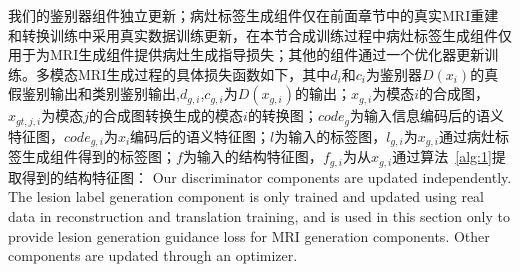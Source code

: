 \documentclass[letterpaper]{article} %
\begin{document}
我们的鉴别器组件独立更新；病灶标签生成组件仅在前面章节中的真实MRI重建和转换训练中采用真实数据训练更新，在本节合成训练过程中病灶标签生成组件仅用于为MRI生成组件提供病灶生成指导损失；其他的组件通过一个优化器更新训练。多模态MRI生成过程的具体损失函数如下，其中$d_{i}$和$c_{i}$为鉴别器$D(x_i)$的真假鉴别输出和类别鉴别输出,$d_{g,i}$,$c_{g,i}$为$D(x_{g,i})$的输出；$x_{g,i}$为模态$i$的合成图，$x_{gt,j,i}$为模态$j$的合成图转换生成的模态$i$的转换图；$code_g$为输入信息编码后的语义特征图，$code_{g,i}$为$x_i$编码后的语义特征图；$l$为输入的标签图，$l_{g,i}$为$x_{g,i}$通过病灶标签生成组件得到的标签图；$f$为输入的结构特征图，$f_{g,i}$为从$x_{g,i}$通过算法~\ref{alg:1}提取得到的结构特征图：
Our discriminator components are updated independently. The lesion label generation component is only trained and updated using real data in reconstruction and translation training, and is used in this section only to provide lesion generation guidance loss for MRI generation components. Other components are updated through an optimizer.
\end{document}
